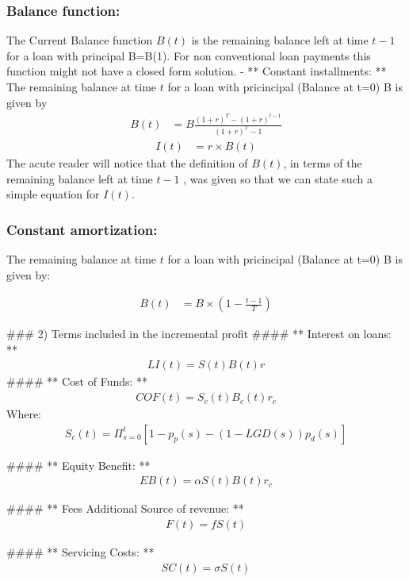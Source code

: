 \documentclass[12pt]{article}
\begin{document}
\subsubsection{Balance function: }
The Current Balance function $B(t)$ is the remaining balance left at time $t-1$ for a loan with principal B=B(1). For non conventional loan payments this function might not have a closed form solution. 
-  ** Constant installments: ** The remaining balance at time $t$ for a loan with pricincipal (Balance at t=0) B is given by 
\begin{align}
B(t)&=B\frac{(1+r)^T-(1+r)^{t-1}}{(1+r)^T-1}
\end{align}
\begin{align}
I(t)&=r\times B(t)
\end{align}
The acute reader will notice that the definition of $B(t)$, in terms of the remaining balance left at time $t-1$ , was given so that we can state such a simple equation for $I(t)$.


\subsubsection{Constant amortization: } The remaining balance at time $t$ for a loan with pricincipal (Balance at t=0) B is given by:

\begin{align}
B(t)&=B \times (1-\frac{t-1}{T})
\end{align}


### 2) Terms included in the incremental profit
#### ** Interest on loans: **
\begin{align}
LI(t) = S(t)B(t)r
\end{align}
#### ** Cost of Funds: **
\begin{align}
COF(t) = S_c(t)B_c(t)r_c
\end{align}
Where: 
\begin{align}
S_c(t)= \Pi_{s=0}^t [1- p_p(s)-(1-LGD(s))p_d(s) ]
\end{align}

#### ** Equity Benefit: **
\begin{align}
EB(t) = \alpha S(t)B(t) r_c
\end{align}

#### ** Fees Additional Source of revenue: **
\begin{align}
F(t) = f S(t)
\end{align}

#### ** Servicing Costs: **
\begin{align}
SC(t) =  \sigma S(t)
\end{align}
\end{document}
